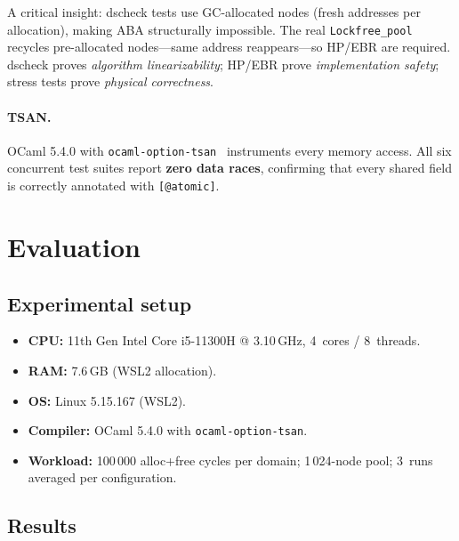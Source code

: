 \documentclass[11pt,a4paper]{article}
\begin{document}
A critical insight: dscheck tests use GC-allocated nodes (fresh addresses per
allocation), making ABA structurally impossible.  The real
\texttt{Lockfree\_pool} recycles pre-allocated nodes---same address
reappears---so HP/EBR are required.  dscheck proves \emph{algorithm
linearizability}; HP/EBR prove \emph{implementation safety}; stress tests prove
\emph{physical correctness}.

\paragraph{TSAN.}
OCaml 5.4.0 with \texttt{ocaml-option-tsan}~\cite{ocamltsan} instruments
every memory access.  All six concurrent test suites report \textbf{zero data
races}, confirming that every shared field is correctly annotated with
\texttt{[@atomic]}.

\section{Evaluation}
\label{sec:evaluation}

\subsection{Experimental setup}

\begin{itemize}[nosep]
  \item \textbf{CPU:} 11th Gen Intel Core i5-11300H @ 3.10\,GHz, 4~cores /
    8~threads.
  \item \textbf{RAM:} 7.6\,GB (WSL2 allocation).
  \item \textbf{OS:} Linux 5.15.167 (WSL2).
  \item \textbf{Compiler:} OCaml 5.4.0 with \texttt{ocaml-option-tsan}.
  \item \textbf{Workload:} 100\,000 alloc+free cycles per domain; 1\,024-node
    pool; 3~runs averaged per configuration.
\end{itemize}

\subsection{Results}
\end{document}
